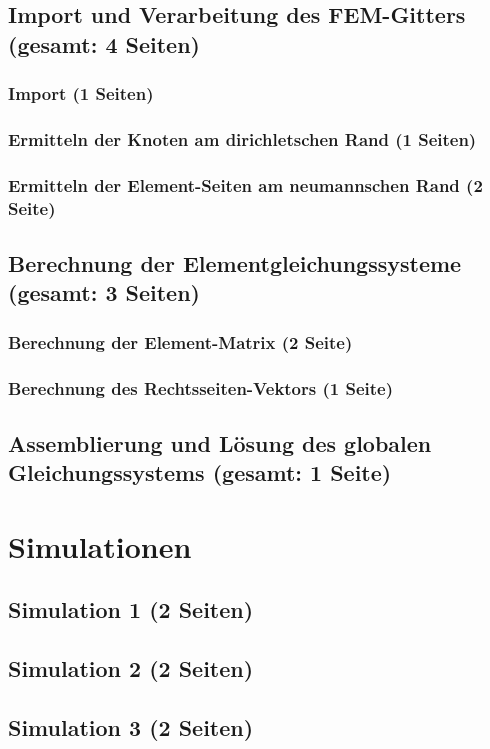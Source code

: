\documentclass[12pt,a4paper]{scrartcl}
\begin{document}
\subsection{Import und Verarbeitung des FEM-Gitters (gesamt: 4 Seiten)}
\subsubsection{Import (1 Seiten)}
\subsubsection{Ermitteln der Knoten am dirichletschen Rand (1 Seiten)}
\subsubsection{Ermitteln der Element-Seiten am neumannschen Rand (2 Seite)}

\subsection{Berechnung der Elementgleichungssysteme (gesamt: 3 Seiten)}
\label{sec:equation_system_calculation}
\subsubsection{Berechnung der Element-Matrix (2 Seite)}
\subsubsection{Berechnung des Rechtsseiten-Vektors (1 Seite)}

\subsection{Assemblierung und Lösung des globalen Gleichungssystems (gesamt: 1 Seite)}
\label{sec:assembling}

\section{Simulationen}
\subsection{Simulation 1 (2 Seiten)}
\subsection{Simulation 2 (2 Seiten)}
\subsection{Simulation 3 (2 Seiten)}


\newpage
{}

\end{document}
